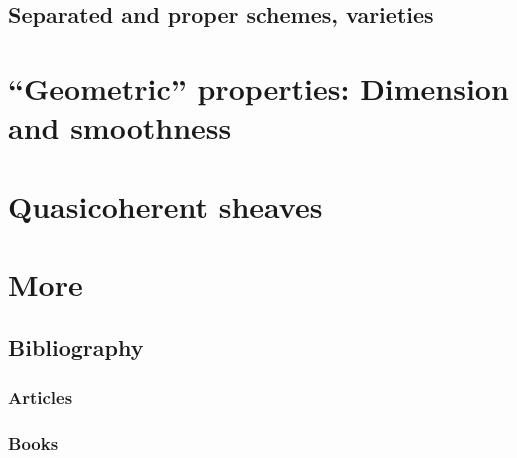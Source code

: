 \documentclass[11pt]{book} %
\begin{document}
\chapter{Separated and proper schemes, varieties}
\part{``Geometric'' properties: Dimension and smoothness}

\part{Quasicoherent sheaves}

\part{More}


\chapter*{Bibliography}


\section*{Articles}
\printbibliography[heading=bibempty,type=article]


\section*{Books}
\printbibliography[heading=bibempty,type=book]


\cleardoublepage
{}
\setlength{\columnsep}{0.75cm}
\printindex

\end{document}
